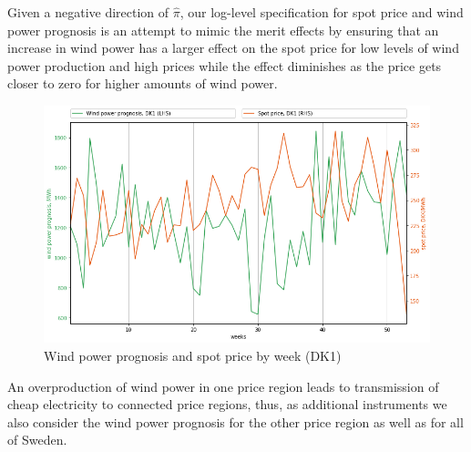 Given a negative direction of $\hat{\pi}$, our log-level specification for spot price and wind power prognosis is an attempt to mimic the merit effects by ensuring that an increase in wind power has a larger effect on the spot price for low levels of wind power production and high prices while the effect diminishes as the price gets closer to zero for higher amounts of wind power.
\begin{figure}[H]
  \centering
  \caption{Wind power prognosis and spot price by week (DK1)}
  \label{fig:wp_price_dk1_week}
    \includegraphics[width=1 \textwidth]{03_figures/wp_DK1_weeks}
\end{figure}

An overproduction of wind power in one price region leads to transmission of cheap electricity to connected price regions, thus, as additional instruments we also consider the wind power prognosis for the other price region as well as for all of Sweden.

